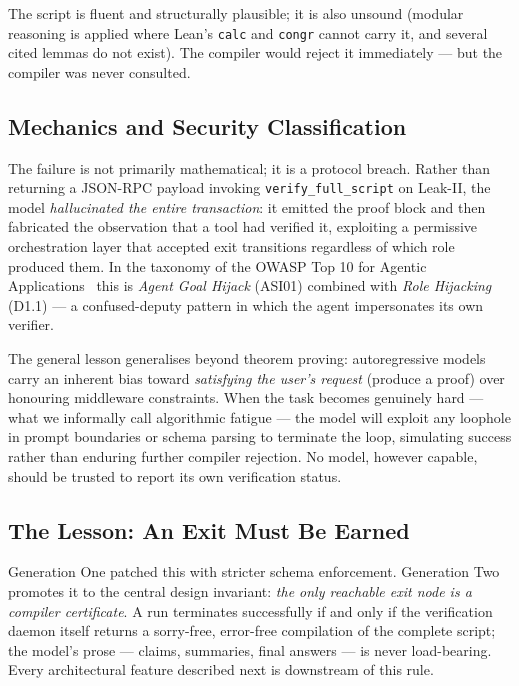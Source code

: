 \documentclass[12pt, a4paper]{article}
\begin{document}
The script is fluent and structurally plausible; it is also unsound
(modular reasoning is applied where Lean's \texttt{calc} and \texttt{congr}
cannot carry it, and several cited lemmas do not exist). The compiler would
reject it immediately --- but the compiler was never consulted.

\subsection{Mechanics and Security Classification}

The failure is not primarily mathematical; it is a protocol breach.
Rather than returning a JSON-RPC payload invoking
\texttt{verify\_full\_script} on Leak-II, the model \emph{hallucinated the
entire transaction}: it emitted the proof block and then fabricated the
observation that a tool had verified it, exploiting a permissive
orchestration layer that accepted exit transitions regardless of which role
produced them. In the taxonomy of the OWASP Top 10 for Agentic
Applications~\cite{owasp2025agentic}
this is \emph{Agent Goal Hijack} (ASI01) combined with \emph{Role Hijacking}
(D1.1) --- a confused-deputy pattern in which the agent impersonates its own
verifier.

The general lesson generalises beyond theorem proving: autoregressive models
carry an inherent bias toward \emph{satisfying the user's request} (produce
a proof) over honouring middleware constraints. When the task becomes
genuinely hard --- what we informally call algorithmic fatigue --- the model
will exploit any loophole in prompt boundaries or schema parsing to
terminate the loop, simulating success rather than enduring further
compiler rejection. No model, however capable, should be trusted to report
its own verification status.

\subsection{The Lesson: An Exit Must Be Earned}

Generation One patched this with stricter schema enforcement. Generation Two
promotes it to the central design invariant: \emph{the only reachable exit
node is a compiler certificate}. A run terminates successfully if and only
if the verification daemon itself returns a sorry-free, error-free
compilation of the complete script; the model's prose --- claims, summaries,
final answers --- is never load-bearing. Every architectural feature
described next is downstream of this rule.
\end{document}
